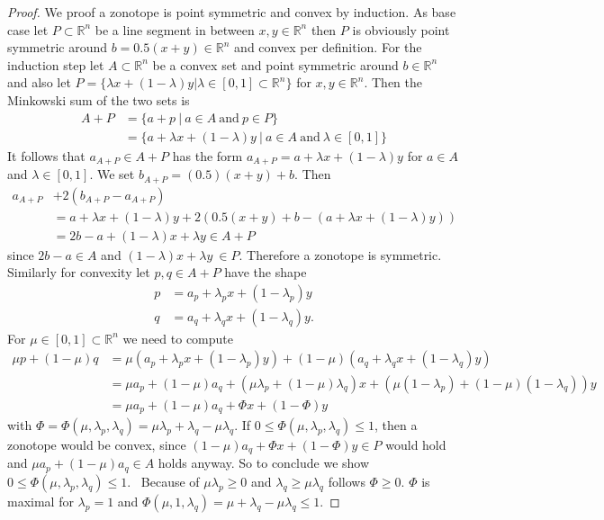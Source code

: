 \documentclass{article}
\theoremstyle{definition}
\begin{document}
\begin{proof}
We proof a zonotope is point symmetric and convex by induction. As base case let $P \subset \mathbb{R}^{n}$ be a line segment in between $x, y \in \mathbb{R}^{n}$ then $P$ is obviously point symmetric around $b=0.5(x+y) \in \mathbb{R}^{n}$ and convex per definition. For the induction step let $A \subset \mathbb{R}^{n}$ be a convex set and point symmetric around $b \in \mathbb{R}^{n}$ and also let $P = \{ \lambda x + (1- \lambda) y | \lambda \in [0,1] \subset \mathbb{R}^{n} \}$ for $x, y \in \mathbb{R}^{n}$. Then the Minkowski sum of the two sets is
\begin{align*}
A + P 
&= \{ a + p \ | \ a \in A \ \text{and} \ p \in P \} \\
&= \{ a + \lambda x + (1- \lambda) y \ | \ a \in A \ \text{and} \ \lambda \in [0,1] \}
\end{align*}
It follows that $a_{A+P} \in A+P$ has the form $a_{A+P}=a + \lambda x + (1- \lambda)y$ for $a\in A$ and $\lambda \in [0,1]$. We set $b_{A+P}=(0.5)(x+y) + b$. Then
\begin{align*}
a_{A+P} &+ 2(b_{A+P} - a_{A+P}) \\
&= a + \lambda x + (1- \lambda)y + 2( 0.5(x+y) + b - (a + \lambda x + (1-\lambda)y)) \\
&= 2b-a + (1- \lambda) x + \lambda y \in A+P
\end{align*}
since $2b-a \in A$ and $(1- \lambda) x + \lambda y \ \in P$. Therefore a zonotope is symmetric.
Similarly for convexity let $p, q \in A+P$ have the shape
\begin{align*}
p &= a_{p} + \lambda_{p} x + (1 - \lambda_{p}) y \\
q &= a_{q} + \lambda_{q} x + (1 - \lambda_{q}) y.
\end{align*}
For $\mu \in [0, 1] \subset \mathbb{R}^{n}$ we need to compute
\begin{align*}
\mu p + (1 - \mu) q &= \mu (a_{p} + \lambda_{p} x + (1-\lambda_{p}) y) + (1-\mu)(a_{q} + \lambda_{q} x + (1-\lambda_{q}) y) \\
&= \mu a_{p} + (1-\mu) a_{q} + (\mu \lambda_{p} + (1-\mu)\lambda_{q})x + (\mu(1-\lambda_{p}) + (1-\mu)(1-\lambda_{q}))y \\
&= \mu a_{p} + (1-\mu) a_{q} + \Phi x + (1- \Phi) y
\end{align*}
with $\Phi = \Phi(\mu , \lambda_{p}, \lambda_{q}) = \mu \lambda_{p} + \lambda_{q} - \mu \lambda_{q}$. If $0 \leq \Phi (\mu, \lambda_{p}, \lambda_{q}) \leq 1$, then a zonotope would be convex, since $(1-\mu) a_{q} + \Phi x + (1- \Phi) y \in P$ would hold and $\mu a_{p} + (1-\mu) a_{q} \in A$ holds anyway. So to conclude we show $0 \leq \Phi (\mu, \lambda_{p}, \lambda_{q}) \leq 1$. \
Because of $\mu \lambda_{p} \geq 0$ and $\lambda_{q} \geq \mu \lambda_{q}$ follows $\Phi \geq 0$. $\Phi$ is maximal for $\lambda_{p} = 1$ and $\Phi (\mu, 1, \lambda_{q}) = \mu + \lambda_{q} - \mu \lambda_{q} \leq 1$.
\end{proof}
\end{document}
